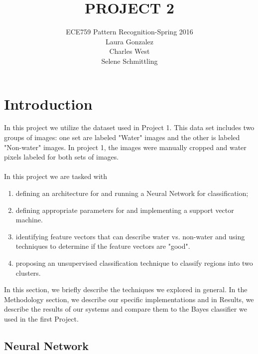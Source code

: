 \documentclass[12pt]{article}
\begin{document}
 
 
\title{PROJECT 2}%
\author{ECE759 Pattern Recognition-Spring 2016\\ %
Laura Gonzalez\\Charles West\\Selene Schmittling\\} %
 
\maketitle

\section{Introduction}

In this project we utilize the dataset used in Project 1.  This data set includes two groups of images: one set are labeled "Water" images and the other is labeled "Non-water" images. In project 1, the images were manually cropped and water pixels labeled for both sets of images. \\
\\
In this project we are tasked with
\begin{enumerate}
	\item defining an architecture for and running a Neural Network for classification;
	\item defining appropriate parameters for and implementing a support vector machine.
	\item identifying feature vectors that can describe water vs. non-water and using techniques to determine if the feature vectors are "good".
	\item proposing an unsupervised classification technique to classify regions into two clusters.
\end{enumerate}
In this section, we briefly describe the techniques we explored in general. In the Methodology section, we describe our specific implementations and in Results, we describe the results of our systems and compare them to the Bayes classifier we used in the first Project. 
\subsection{Neural Network}
\end{document}
